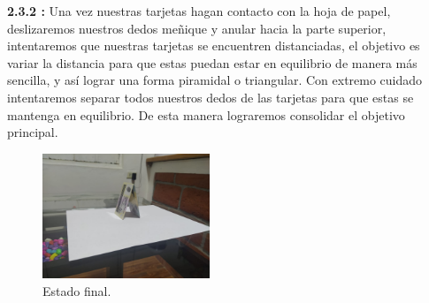 \documentclass{article}
\begin{document}
\textbf{2.3.2 :} Una vez nuestras tarjetas hagan contacto con la hoja de papel, deslizaremos nuestros dedos meñique y anular hacia la parte superior, intentaremos que nuestras tarjetas se encuentren distanciadas, el objetivo es variar la distancia para que estas puedan estar en equilibrio de manera más sencilla, y así lograr una forma piramidal o triangular. Con extremo cuidado intentaremos separar todos nuestros dedos de las tarjetas para que estas se mantenga en equilibrio. De esta manera lograremos consolidar el objetivo principal.
\begin{figure}[h]
\includegraphics[width=5cm]{WhatsApp Image 2021-03-06 at 3.46.25 PM.jpeg}
\centering
\caption{Estado final.}
\label{fig:final}
\end{figure}



\end{document}
